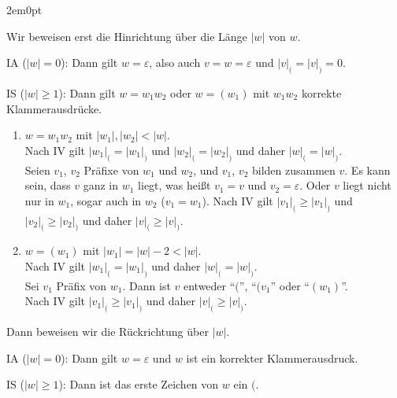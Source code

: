 \documentclass[12pt,a4paper,oneside]{article}
\newcommand{\afz}[1]{\enquote{#1}}
\newcommand{\emptyline}{\hspace*{\fill}}
\begin{document}
            \begin{adjustwidth}{2em}{0pt}

                Wir beweisen erst die Hinrichtung über die Länge $|w|$ von $w$.

                \emptyline

                IA ($|w| = 0$): Dann gilt $w = \varepsilon$, also auch $v = w = \varepsilon$ und $|v|_( = |v|_) = 0$.

                \emptyline

                IS ($|w| \geq 1$): Dann gilt $w = w_1w_2$ oder $w = (w_1)$ mit $w_1w_2$ korrekte Klammerausdrücke.

                \begin{enumerate}
                    \item $w = w_1w_2$ mit $|w_1|, |w_2| < |w|$. \\
                          Nach IV gilt $|w_1|_( = |w_1|_)$ und $|w_2|_( = |w_2|_)$ und daher $|w|_( = |w|_)$. \\
                          Seien $v_1$, $v_2$ Präfixe von $w_1$ und $w_2$, und $v_1$, $v_2$ bilden zusammen $v$.
                          Es kann sein, dass $v$ ganz in $w_1$ liegt, was heißt $v_1 = v$ und $v_2 = \varepsilon$.
                          Oder $v$ liegt nicht nur in $w_1$, sogar auch in $w_2$ ($v_1 = w_1$).
                          Nach IV gilt $|v_1|_( \geq |v_1|_)$ und $|v_2|_( \geq |v_2|_)$ und daher $|v|_( \geq |v|_)$.
                    \item $w = (w_1)$ mit $|w_1| = |w| - 2 < |w|$. \\
                          Nach IV gilt $|w_1|_( = |w_1|_)$ und daher $|w|_( = |w|_)$. \\
                          Sei $v_1$ Präfix von $w_1$.
                          Dann ist $v$ entweder \afz{$($}, \afz{$(v_1$} oder \afz{$(w_1)$}. \\
                          Nach IV gilt $|v_1|_( \geq |v_1|_)$ und daher $|v|_( \geq |v|_)$.
                \end{enumerate}

                Dann beweisen wir die Rückrichtung über $|w|$.

                \emptyline

                IA ($|w| = 0$): Dann gilt $w = \varepsilon$ und $w$ ist ein korrekter Klammerausdruck.

                \emptyline

                IS ($|w| \geq 1$): Dann ist das erste Zeichen von $w$ ein $($.


\end{adjustwidth}
\end{document}
